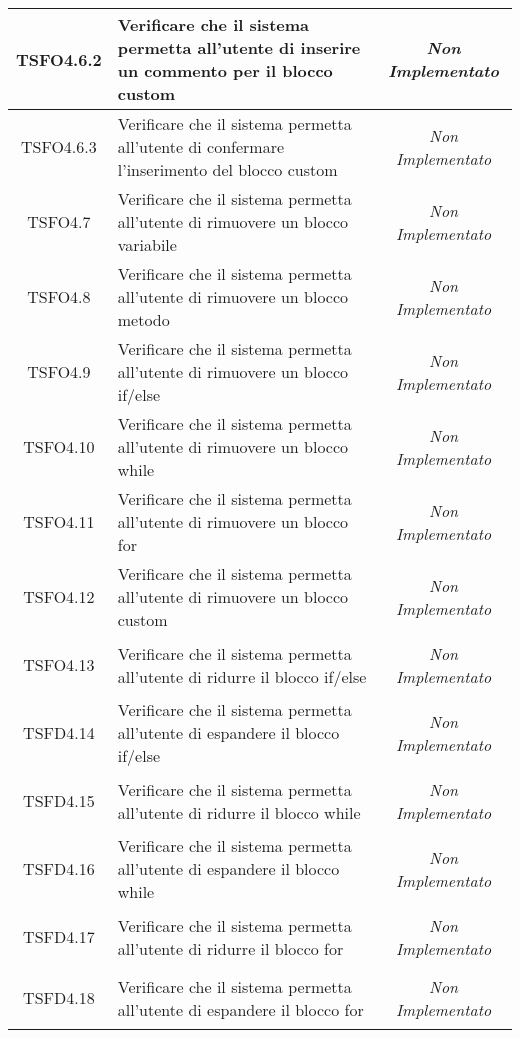 \begin{longtable}{|c|>{}m{8cm}|c|}
\hypertarget{TSFO4.6.2}{TSFO4.6.2} & Verificare che il sistema permetta all'utente di inserire un commento per il blocco custom & \textit{Non Implementato}\\ \hline
\hypertarget{TSFO4.6.3}{TSFO4.6.3} & Verificare che il sistema permetta all'utente di confermare l'inserimento del blocco custom & \textit{Non Implementato}\\ \hline
\hypertarget{TSFO4.7}{TSFO4.7} & Verificare che il sistema permetta all'utente di rimuovere un blocco variabile & \textit{Non Implementato}\\ \hline
\hypertarget{TSFO4.8}{TSFO4.8} & Verificare che il sistema permetta all'utente di rimuovere un blocco metodo & \textit{Non Implementato}\\ \hline
\hypertarget{TSFO4.9}{TSFO4.9} & Verificare che il sistema permetta all'utente di rimuovere un blocco if/else & \textit{Non Implementato}\\ \hline
\hypertarget{TSFO4.10}{TSFO4.10} & Verificare che il sistema permetta all'utente di rimuovere un blocco while & \textit{Non Implementato}\\ \hline
\hypertarget{TSFO4.11}{TSFO4.11} & Verificare che il sistema permetta all'utente di rimuovere un blocco for & \textit{Non Implementato}\\ \hline
\hypertarget{TSFO4.12}{TSFO4.12} & Verificare che il sistema permetta all'utente di rimuovere un blocco custom & \textit{Non Implementato}\\ \hline
\hypertarget{TSFO4.13}{TSFO4.13} & Verificare che il sistema permetta all'utente di ridurre il blocco if/else & \textit{Non Implementato}\\ \hline
\hypertarget{TSFD4.14}{TSFD4.14} & Verificare che il sistema permetta all'utente di espandere il blocco if/else & \textit{Non Implementato}\\ \hline
\hypertarget{TSFD4.15}{TSFD4.15} & Verificare che il sistema permetta all'utente di ridurre il blocco while & \textit{Non Implementato}\\ \hline
\hypertarget{TSFD4.16}{TSFD4.16} & Verificare che il sistema permetta all'utente di espandere il blocco while & \textit{Non Implementato}\\ \hline
\hypertarget{TSFD4.17}{TSFD4.17} & Verificare che il sistema permetta all'utente di ridurre il blocco for & \textit{Non Implementato}\\ \hline
\hypertarget{TSFD4.18}{TSFD4.18} & Verificare che il sistema permetta all'utente di espandere il blocco for & \textit{Non Implementato}\\ \hline

\end{longtable}
